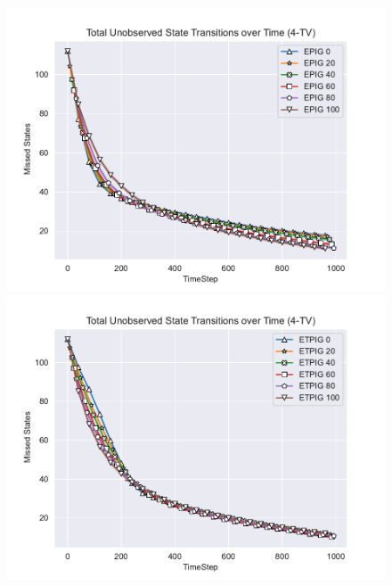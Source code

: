 \documentclass[12pt]{thesis}
\begin{document}
\begin{figure}[p]
	
	\includegraphics[scale=0.5]{"images/Epsilon_Missed_States_EPIG_4-TV.pdf"}
	\includegraphics[scale=0.5]{"images/Epsilon_Missed_States_ETPIG_4-TV.pdf"}
	

\end{figure}
\end{document}
